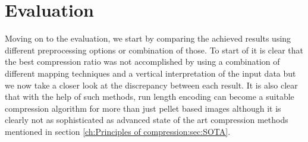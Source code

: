 
\chapter{Evaluation}
\label{ch:Evaluation}
Moving on to the evaluation, we start by comparing the achieved results using different preprocessing options or combination of those. To start of it is clear that the best compression ratio was not accomplished by using a combination of different mapping techniques and a vertical interpretation of the input data but we now take a closer look at the discrepancy between each result. It is also clear that with the help of such methods, run length encoding can become a suitable compression algorithm for more than just pellet based images although it is clearly not as sophisticated as advanced state of the art compression methods mentioned in section \ref{ch:Principles of compression:sec:SOTA}.

